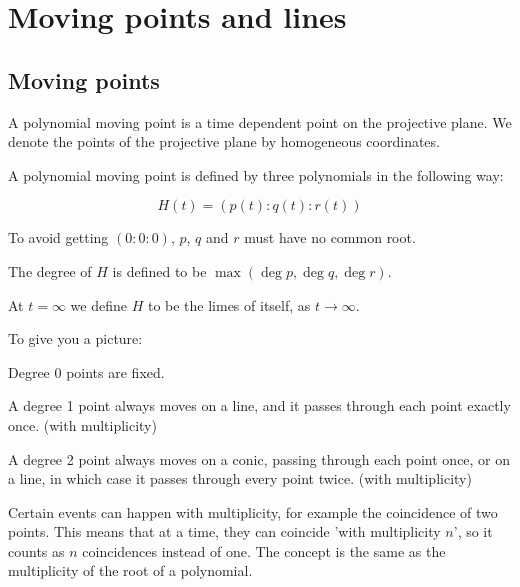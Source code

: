 \documentclass[a4paper]{article}
\begin{document}
\section{Moving points and lines}

\subsection{Moving points}

A polynomial moving point is a time dependent point on the projective plane. We denote the points of the projective plane by homogeneous coordinates.

\begin{definition}
\hfill\break
A polynomial moving point is defined by three polynomials in the following way:

$$H(t)=(p(t):q(t):r(t))$$

To avoid getting $(0:0:0)$, $p$, $q$ and $r$ must have no common root.

The degree of $H$ is defined to be $\max(\deg p, \deg q, \deg r)$.




\end{definition}
    
\begin{remark}
    At $t=\infty$ we define $H$ to be the limes of itself, as $t\rightarrow \infty$.
\end{remark}
To give you a picture:



\begin{lemma}
\hfill\break
    Degree 0 points are fixed.

    A degree 1 point always moves on a line, and it passes through each point exactly once. (with multiplicity)

    A degree 2 point always moves on a conic, passing through each point once, or on a line, in which case it passes through every point twice.
    (with multiplicity)
\end{lemma}

\begin{remark}[Multiplicity]
    Certain events can happen with multiplicity, for example the coincidence of two points. This means that at a time, they can coincide 'with multiplicity $n$', so it counts as $n$ coincidences instead of one. The concept is the same as the multiplicity of the root of a polynomial.%
\end{remark}
\end{document}
